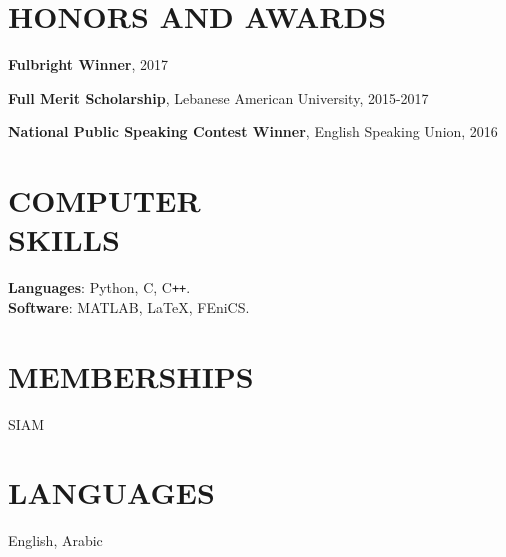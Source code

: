 \documentclass[margin]{res}
\begin{document}
\begin{resume}
\section{HONORS AND AWARDS}
\par
\textbf{Fulbright Winner}, 2017 
\par
\textbf{Full Merit Scholarship}, Lebanese American University, 2015-2017  \par
\textbf{National Public Speaking Contest  Winner}, English Speaking Union, 2016 





\section{COMPUTER\\SKILLS}

\textbf{Languages}: Python, C, C\texttt{++}. 
\\
\textbf{Software}: MATLAB, \LaTeX, FEniCS.


\section{MEMBERSHIPS}

\par
SIAM
\section{LANGUAGES} 
English, Arabic 


\end{resume}
\end{document}
